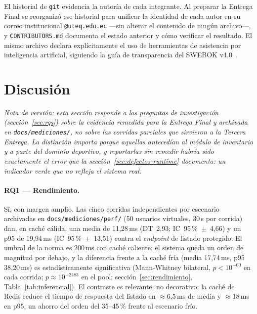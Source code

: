 \documentclass[11pt,a4paper]{article}
\newcommand{\ruta}[1]{\texttt{\footnotesize #1}}
\begin{document}
El historial de \texttt{git} evidencia la autoría de cada integrante. Al
preparar la Entrega Final se reorganizó ese historial para unificar la
identidad de cada autor en su correo institucional \texttt{@uteq.edu.ec}
—sin alterar el contenido de ningún archivo—, y \ruta{CONTRIBUTORS.md}
documenta el estado anterior y cómo verificar el resultado. El mismo
archivo declara explícitamente el uso de herramientas de asistencia por
inteligencia artificial, siguiendo la guía de transparencia del SWEBOK
v4.0~\cite{swebok2024}.

\section{Discusión}
\label{sec:discusion}

\textit{Nota de versión: esta sección responde a las preguntas de
investigación (sección~\ref{sec:rqs}) sobre la evidencia remedida para la
Entrega Final y archivada en \ruta{docs/mediciones/}, no sobre las
corridas parciales que sirvieron a la Tercera Entrega. La distinción
importa porque aquellas antecedían al módulo de inventario y a parte del
dominio deportivo, y reportarlas sin remedir habría sido exactamente el
error que la sección~\ref{sec:defectos-runtime} documenta: un indicador
verde que no refleja el sistema real.}

\paragraph{RQ1 — Rendimiento.} Sí, con margen amplio. Las cinco corridas
independientes por escenario archivadas en \ruta{docs/mediciones/perf/}
(50 usuarios virtuales, 30\,s por corrida) dan, en caché cálida, una media
de 11{,}28\,ms (DT~2{,}93; IC~95\,\%~$\pm$~4{,}66) y un p95 de
19{,}94\,ms (IC~95\,\%~$\pm$~13{,}51) contra el \emph{endpoint} de
listado protegido. El umbral de la norma es 200\,ms con caché caliente:
el sistema queda un orden de magnitud por debajo, y la diferencia frente a
la caché fría (media 17{,}74\,ms, p95 38{,}20\,ms) es estadísticamente
significativa (Mann-Whitney bilateral, $p < 10^{-60}$ en cada corrida;
$p \approx 10^{-2483}$ en el pool; sección~\ref{sec:rendimiento},
Tabla~\ref{tab:inferencial}). El contraste es relevante, no decorativo:
la caché de Redis reduce el tiempo de respuesta del listado en
$\approx$6{,}5\,ms de media y $\approx$18\,ms en p95, un ahorro del
orden del 35--45\,\% frente al escenario frío.
\end{document}
